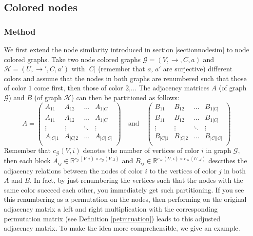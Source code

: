 \documentclass[a4paper,11pt]{report}
\newcommand{\R}{{\mathbb R}}
\newcommand{\graf}{\mathscr{G}}
\newcommand{\grafeen}{\mathscr{H}}
\begin{document}
\subsection{Colored nodes}
\subsubsection{Method}
We first extend the node similarity introduced in section \ref{sectionnodesim} to 
node colored graphs. Take two node colored graphs $\graf=(V,\to, C, a)$ and $\grafeen=(U,\to', C, a')$ with $|C|$ (remember that $a$, $a'$ are surjective) different colors and assume that the nodes 
in both graphs are renumbered such that those of color $1$ come first, then 
those of color $2$,... The adjacency matrices $A$ (of graph $\graf$) and $B$ (of graph $\grafeen$) 
can then be partitioned as follows:
$$A = \begin{pmatrix}
A_{11} & A_{12} & \ldots & A_{1|C|}\\
A_{11} & A_{12} & \ldots & A_{1|C|}\\
\vdots & \vdots & \ddots & \vdots\\
A_{|C|1} & A_{|C|2} & \ldots & A_{|C||C|}\\
\end{pmatrix}
 \quad \text{and} \quad
 \begin{pmatrix}
B_{11} & B_{12} & \ldots & B_{1|C|}\\
B_{11} & B_{12} & \ldots & B_{1|C|}\\
\vdots & \vdots & \ddots & \vdots\\
B_{|C|1} & B_{|C|2} & \ldots & B_{|C||C|}\\
\end{pmatrix}$$
Remember that $c_\graf(V,i)$ denotes the number of vertices of color $i$ in graph $\graf$, then each block $A_{ij} \in \R^{c_\graf(V,i)\times c_\graf(V,j)}$ and $B_{ij} \in \R^{c_\grafeen(U,i)\times c_\grafeen(U,j)}$ 
describes the adjacency relations between the nodes of color $i$ to the vertices 
of color $j$ in both $A$ and $B$. In fact, by just renumbering the vertices such 
that the nodes with the same color succeed each other, you immediately get such 
partitioning. If you see this renumbering as a permutation on the nodes,
then performing on the original adjacency matrix a left and right multiplication with the corresponding permutation matrix (see Definition 
\ref{petmruation}) leads to this adjusted adjacency matrix.
To make the idea more comprehensible, we give an example.
\end{document}
